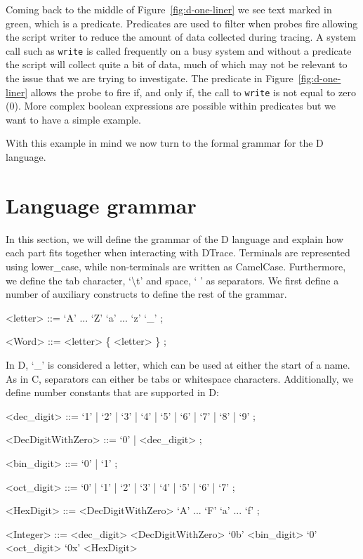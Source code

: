 Coming back to the middle of Figure~\ref{fig:d-one-liner} we see text
marked in green, which is a predicate.  Predicates are used to filter
when probes fire allowing the script writer to reduce the amount of
data collected during tracing.  A system call such as \texttt{write}
is called frequently on a busy system and without a predicate the
script will collect quite a bit of data, much of which may not be
relevant to the issue that we are trying to investigate.  The
predicate in Figure~\ref{fig:d-one-liner} allows the probe to fire if,
and only if, the call to \texttt{write} is not equal to zero (0).
More complex boolean expressions are possible within predicates but we
want to have a simple example.

With this example in mind we now turn to the formal grammar for the D
language.

\section{Language grammar}
\label{sec:grammar}

\setlength{\grammarparsep}{5pt plus 1pt minus 1pt} %
\setlength{\grammarindent}{12em} %

%



In this section, we will define the grammar of the D language and explain how
each part fits together when interacting with DTrace. Terminals are represented
using lower\_case, while non-terminals are written as CamelCase. Furthermore, we
define the tab character, `\textbackslash t' and space, ` ' as separators. We first
define a number of auxiliary constructs to define the rest of the grammar.

\begin{grammar}
<letter> ::= `A' ... `Z'
	\alt `a' ... `z'
	\alt `\_' ;

<Word> ::= <letter> \{ <letter> \} ;
\end{grammar}

\noindent
In D, `\_' is considered a letter, which can be used at either the start of a
name. As in C, separators can either be tabs or whitespace characters.
Additionally, we define number constants that are supported in D:

\begin{grammar}
<dec\_digit> ::= `1' | `2' | `3' | `4' | `5' | `6' | `7' | `8' | `9' ;

<DecDigitWithZero> ::= `0' | <dec\_digit> ;

<bin\_digit> ::= `0' | `1' ;

<oct\_digit> ::= `0' | `1' | `2' | `3' | `4' | `5' | `6' | `7' ;

<HexDigit> ::=  <DecDigitWithZero>
           \alt `A' ... `F'
           \alt `a' ... `f' ;

<Integer> ::=  <dec\_digit> <DecDigitWithZero>
          \alt `0b' <bin\_digit>
          \alt `0' <oct\_digit>
          \alt `0x' <HexDigit>
\end{grammar}

